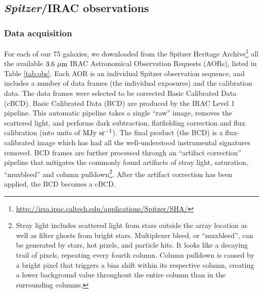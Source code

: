 \documentclass[preprint2]{emulateapj}
\begin{document}





\subsection{\emph{Spitzer}/IRAC observations}
\subsubsection{Data acquisition}
For each of our 75 galaxies, we downloaded from the 
Spitzer Heritage Archive\footnote{\url{http://irsa.ipac.caltech.edu/applications/Spitzer/SHA/}} 
all the available $3.6~\rm \mu m$ IRAC Astronomical Observation Requests (AORs), 
listed in Table \ref{tab:obs}.
Each AOR is an individual Spitzer observation sequence, and
includes a number of data frames (the individual exposures) and the calibration data.
The data frames were selected to be %
corrected Basic Calibrated Data (cBCD).
Basic Calibrated Data (BCD) are produced by the IRAC Level 1 pipeline. 
This automatic pipeline takes a single ``raw'' image, removes the scattered light, 
and performs dark subtraction, flatfielding correction and flux calibration (into units of $\rm MJy~sr^{-1}$). 
The final product (the BCD) is a flux-calibrated image which has had all the well-understood instrumental signatures removed.
BCD frames are further processed through an ``artifact correction'' pipeline 
that mitigates the commonly found artifacts of stray light, saturation, ``muxbleed'' and column pulldown\footnote{Stray light 
includes scattered light from stars outside the array location as well as filter ghosts from bright stars. 
Multiplexer bleed, or ``muxbleed'', can be generated by stars, hot pixels, and particle hits.
It looks like a decaying trail of pixels, repeating every fourth column.
Column pulldown is caused by a bright pixel that triggers a bias shift within its respective column, 
creating a lower background value throughout the entire column than in the surrounding columns.}.
After the artifact correction has been applied, the BCD becomes a cBCD.
\end{document}
